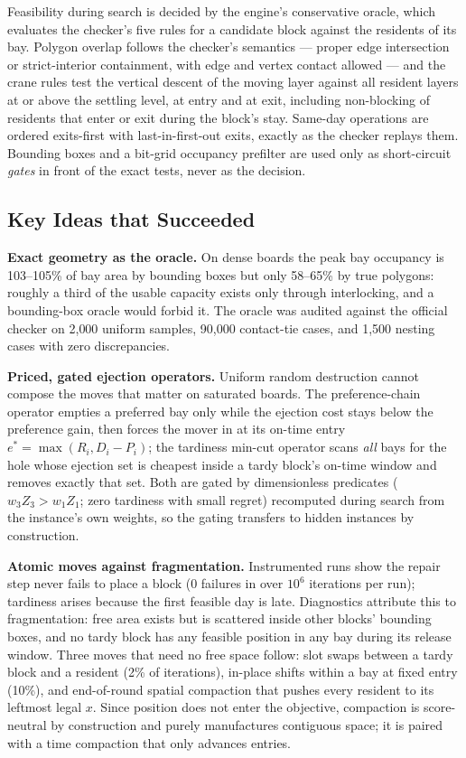 \documentclass[runningheads]{llncs}
\begin{document}
Feasibility during search is decided by the engine's conservative oracle,
which evaluates the checker's five rules for a candidate block against the
residents of its bay. Polygon overlap follows the checker's semantics ---
proper edge intersection or strict-interior containment, with edge and vertex
contact allowed --- and the crane rules test the vertical descent of the
moving layer against all resident layers at or above the settling level, at
entry and at exit, including non-blocking of residents that enter or exit
during the block's stay. Same-day operations are ordered exits-first with
last-in-first-out exits, exactly as the checker replays them. Bounding boxes
and a bit-grid occupancy prefilter are used only as short-circuit
\emph{gates} in front of the exact tests, never as the decision.

\subsection{Key Ideas that Succeeded}

\textbf{Exact geometry as the oracle.} On dense boards the peak bay
occupancy is 103--105\% of bay area by bounding boxes but only 58--65\% by
true polygons: roughly a third of the usable capacity exists only through
interlocking, and a bounding-box oracle would forbid it. The oracle was
audited against the official checker on 2{,}000 uniform samples, 90{,}000
contact-tie cases, and 1{,}500 nesting cases with zero discrepancies.

\textbf{Priced, gated ejection operators.} Uniform random destruction cannot
compose the moves that matter on saturated boards. The preference-chain
operator empties a preferred bay only while the ejection cost stays below the
preference gain, then forces the mover in at its on-time entry
$e^\ast = \max(R_i, D_i - P_i)$; the tardiness min-cut operator scans
\emph{all} bays for the hole whose ejection set is cheapest inside a tardy
block's on-time window and removes exactly that set. Both are gated by
dimensionless predicates ($w_3 Z_3 > w_1 Z_1$; zero tardiness with small
regret) recomputed during search from the instance's own weights, so the
gating transfers to hidden instances by construction.

\textbf{Atomic moves against fragmentation.} Instrumented runs show the
repair step never fails to place a block (0 failures in over $10^6$
iterations per run); tardiness arises because the first feasible day is late.
Diagnostics attribute this to fragmentation: free area exists but is
scattered inside other blocks' bounding boxes, and no tardy block has any
feasible position in any bay during its release window. Three moves that need
no free space follow: slot swaps between a tardy block and a resident (2\% of
iterations), in-place shifts within a bay at fixed entry (10\%), and
end-of-round spatial compaction that pushes every resident to its leftmost
legal $x$. Since position does not enter the objective, compaction is
score-neutral by construction and purely manufactures contiguous space; it is
paired with a time compaction that only advances entries.
\end{document}
